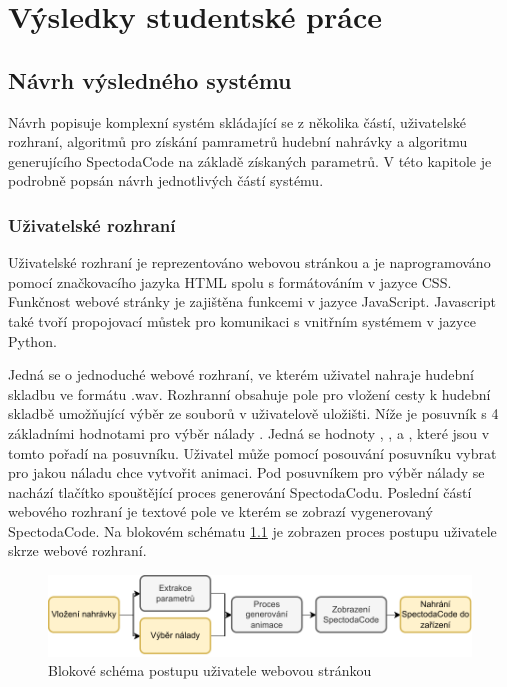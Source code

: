 \chapter{Výsledky studentské práce}


\section{Návrh výsledného systému}

Návrh popisuje komplexní systém skládající se z několika částí, uživatelské rozhraní, algoritmů pro získání pamrametrů hudební nahrávky a algoritmu generujícího SpectodaCode na základě získaných parametrů. V této kapitole je podrobně popsán návrh jednotlivých částí systému. 

\subsection{Uživatelské rozhraní} \label{sec:User_interface}

Uživatelské rozhraní je reprezentováno webovou stránkou a je naprogramováno pomocí značkovacího jazyka \acs{HTML} spolu s formátováním v jazyce CSS. Funkčnost webové stránky je zajištěna funkcemi v jazyce JavaScript. Javascript také tvoří propojovací můstek pro komunikaci s vnitřním systémem v jazyce Python.

Jedná se o jednoduché webové rozhraní, ve kterém uživatel nahraje hudební skladbu ve formátu .wav. Rozhranní obsahuje pole pro vložení cesty k hudební skladbě umožňující výběr ze souborů v uživatelově uložišti. Níže je posuvník s 4 základními hodnotami pro výběr nálady
. Jedná se hodnoty , ,  a , které jsou v tomto pořadí na posuvníku. Uživatel může pomocí posouvání posuvníku vybrat pro jakou náladu chce vytvořit animaci. Pod posuvníkem pro výběr nálady se nachází tlačítko spouštějící proces generování SpectodaCodu.
Poslední částí webového rozhraní je textové pole ve kterém se zobrazí vygenerovaný SpectodaCode. Na blokovém schématu \ref{fig:User_interaction_diagram} je zobrazen proces postupu uživatele skrze webové rozhraní. 

 \begin{figure}[H]
    \centering
    \includegraphics[width = 1\linewidth]{obrazky/User_interaction_diagram.pdf}
    \caption{Blokové schéma postupu uživatele webovou stránkou}
    \label{fig:User_interaction_diagram}
\end{figure}

